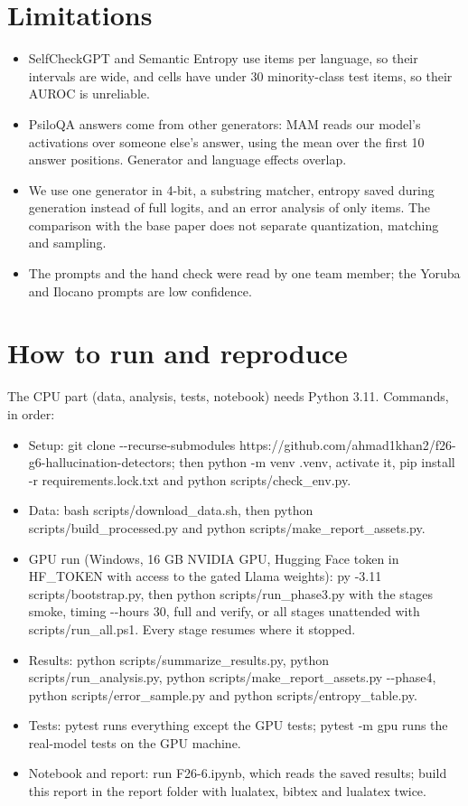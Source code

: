 \documentclass[12pt]{article}
\newcommand{\dd}{-\kern0pt-}
\begin{document}
\section{Limitations}
\begin{itemize}
\item SelfCheckGPT and Semantic Entropy use \samplingn{} items per language, so their intervals are wide, and \thinn{} cells have under 30 minority-class test items, so their AUROC is unreliable.
\item PsiloQA answers come from other generators: MAM reads our model's activations over someone else's answer, using the mean over the first 10 answer positions. Generator and language effects overlap.
\item We use one generator in 4-bit, a substring matcher, entropy saved during generation instead of full logits, and an error analysis of only \errn{} items. The comparison with the base paper does not separate quantization, matching and sampling.
\item The prompts and the hand check were read by one team member; the Yoruba and Ilocano prompts are low confidence.
\end{itemize}

\section{How to run and reproduce}
The CPU part (data, analysis, tests, notebook) needs Python 3.11. Commands, in order:

\begin{itemize}
\item Setup: git clone \dd{}recurse-submodules https://github.com/ahmad1khan2/f26-g6-hallucination-detectors; then python -m venv .venv, activate it, pip install -r requirements.lock.txt and python scripts/check\_env.py.
\item Data: bash scripts/download\_data.sh, then python scripts/build\_processed.py and python scripts/make\_report\_assets.py.
\item GPU run (Windows, 16 GB NVIDIA GPU, Hugging Face token in HF\_TOKEN with access to the gated Llama weights): py -3.11 scripts/bootstrap.py, then python scripts/run\_phase3.py with the stages smoke, timing \dd{}hours 30, full and verify, or all stages unattended with scripts/run\_all.ps1. Every stage resumes where it stopped.
\item Results: python scripts/summarize\_results.py, python scripts/run\_analysis.py, python scripts/make\_report\_assets.py \dd{}phase4, python scripts/error\_sample.py and python scripts/entropy\_table.py.
\item Tests: pytest runs everything except the GPU tests; pytest -m gpu runs the real-model tests on the GPU machine.
\item Notebook and report: run F26-6.ipynb, which reads the saved results; build this report in the report folder with lualatex, bibtex and lualatex twice.
\end{itemize}
\end{document}
